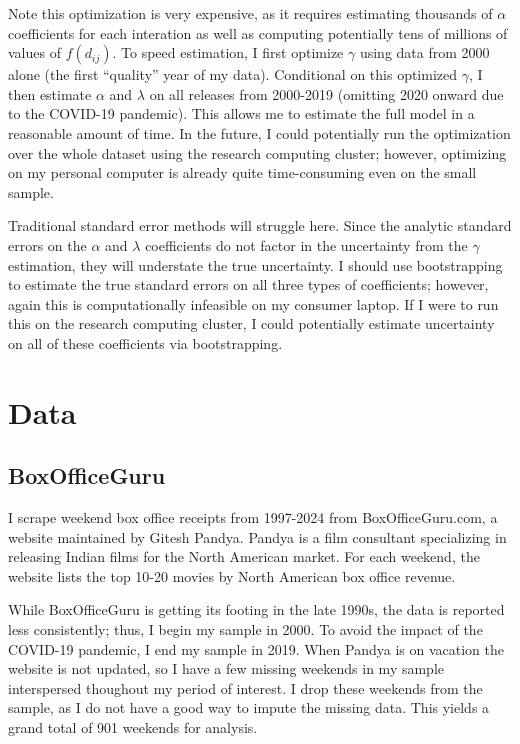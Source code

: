 \documentclass{article}
\begin{document}
Note this optimization is very expensive, as it requires estimating thousands of $\alpha$ coefficients for each interation as well as computing potentially tens of millions of values of $f(d_{ij})$. To speed estimation, I first optimize $\gamma$ using data from 2000 alone (the first ``quality'' year of my data). Conditional on this optimized $\gamma$, I then estimate $\alpha$ and $\lambda$ on all releases from 2000-2019 (omitting 2020 onward due to the COVID-19 pandemic). This allows me to estimate the full model in a reasonable amount of time. In the future, I could potentially run the optimization over the whole dataset using the research computing cluster; however, optimizing on my personal computer is already quite time-consuming even on the small sample.

Traditional standard error methods will struggle here. Since the analytic standard errors on the $\alpha$ and $\lambda$ coefficients do not factor in the uncertainty from the $\gamma$ estimation, they will understate the true uncertainty. I should use bootstrapping to estimate the true standard errors on all three types of coefficients; however, again this is computationally infeasible on my consumer laptop. If I were to run this on the research computing cluster, I could potentially estimate uncertainty on all of these coefficients via bootstrapping. 


\section{Data}

\subsection{BoxOfficeGuru}

I scrape weekend box office receipts from 1997-2024 from BoxOfficeGuru.com, a website maintained by Gitesh Pandya. Pandya is a film consultant specializing in releasing Indian films for the North American market. For each weekend, the website lists the top 10-20 movies by North American box office revenue. 

While BoxOfficeGuru is getting its footing in the late 1990s, the data is reported less consistently; thus, I begin my sample in 2000. To avoid the impact of the COVID-19 pandemic, I end my sample in 2019. When Pandya is on vacation the website is not updated, so I have a few missing weekends in my sample interspersed thoughout my period of interest. I drop these weekends from the sample, as I do not have a good way to impute the missing data. This yields a grand total of 901 weekends for analysis.
\end{document}
